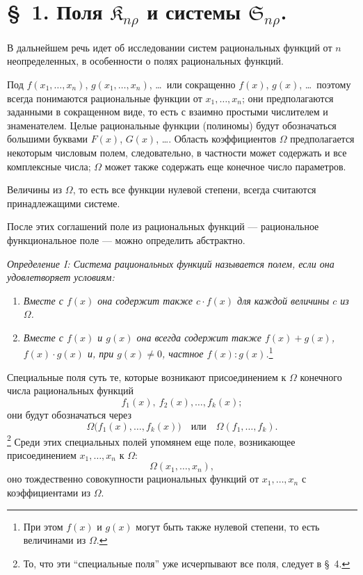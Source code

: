\documentclass[11pt]{article}
\providecommand{\Kfield}{\mathfrak{K}}
\providecommand{\Ssys}{\mathfrak{S}}
\begin{document}
\section*{\S\ 1. Поля $\Kfield_{n\rho}$ и системы $\Ssys_{n\rho}$.}

В дальнейшем речь идет об исследовании систем рациональных функций от $n$ неопределенных, в особенности о полях рациональных функций.

Под $f(x_1,\ldots,x_n)$, $g(x_1,\ldots,x_n)$, \ldots\ или сокращенно $f(x)$, $g(x)$, \ldots\ поэтому всегда понимаются рациональные функции от $x_1,\ldots,x_n$; они предполагаются заданными в сокращенном виде, то есть с взаимно простыми числителем и знаменателем. Целые рациональные функции (полиномы) будут обозначаться большими буквами $F(x)$, $G(x)$, \ldots. Область коэффициентов $\Omega$ предполагается некоторым числовым полем, следовательно, в частности может содержать и все комплексные числа; $\Omega$ может также содержать еще конечное число параметров.

Величины из $\Omega$, то есть все функции нулевой степени, всегда считаются принадлежащими системе.

После этих соглашений поле из рациональных функций --- рациональное функциональное поле --- можно определить абстрактно.

\emph{Определение I: Система рациональных функций называется полем, если она удовлетворяет условиям:}
\begin{enumerate}
\item \emph{Вместе с $f(x)$ она содержит также $c\cdot f(x)$ для каждой величины $c$ из $\Omega$.}
\item \emph{Вместе с $f(x)$ и $g(x)$ она всегда содержит также $f(x)+g(x)$, $f(x)\cdot g(x)$ и, при $g(x)\ne0$, частное $f(x):g(x)$.}\footnote{При этом $f(x)$ и $g(x)$ могут быть также нулевой степени, то есть величинами из $\Omega$.}
\end{enumerate}
Специальные поля суть те, которые возникают присоединением к $\Omega$ конечного числа рациональных функций
\[
  f_1(x),\ f_2(x),\ldots, f_k(x);
\]
они будут обозначаться через
\[
  \Omega\bigl(f_1(x),\ldots,f_k(x)\bigr)
  \quad\text{или}\quad
  \Omega(f_1,\ldots,f_k).
\]
\footnote{То, что эти ``специальные поля'' уже исчерпывают все поля, следует в \S\ 4.}
Среди этих специальных полей упомянем еще поле, возникающее присоединением $x_1,\ldots,x_n$ к $\Omega$:
\[
  \Omega(x_1,\ldots,x_n),
\]
оно тождественно совокупности рациональных функций от $x_1,\ldots,x_n$ с коэффициентами из $\Omega$.
\end{document}
